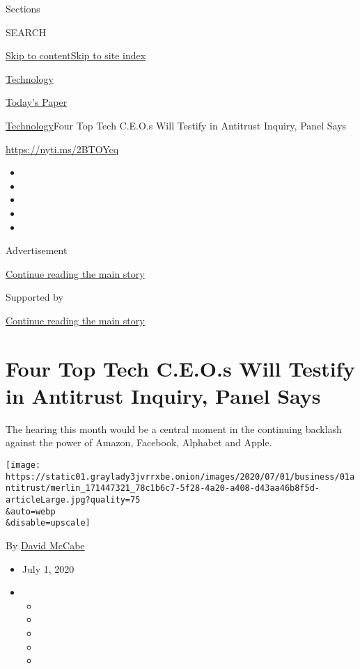 Sections

SEARCH

\protect\hyperlink{site-content}{Skip to
content}\protect\hyperlink{site-index}{Skip to site index}

\href{https://www.nytimes3xbfgragh.onion/section/technology}{Technology}

\href{https://myaccount.nytimes3xbfgragh.onion/auth/login?response_type=cookie\&client_id=vi}{}

\href{https://www.nytimes3xbfgragh.onion/section/todayspaper}{Today's
Paper}

\href{/section/technology}{Technology}\textbar{}Four Top Tech C.E.O.s
Will Testify in Antitrust Inquiry, Panel Says

\url{https://nyti.ms/2BTOYcq}

\begin{itemize}
\item
\item
\item
\item
\item
\end{itemize}

Advertisement

\protect\hyperlink{after-top}{Continue reading the main story}

Supported by

\protect\hyperlink{after-sponsor}{Continue reading the main story}

\hypertarget{four-top-tech-ceos-will-testify-in-antitrust-inquiry-panel-says}{%
\section{Four Top Tech C.E.O.s Will Testify in Antitrust Inquiry, Panel
Says}\label{four-top-tech-ceos-will-testify-in-antitrust-inquiry-panel-says}}

The hearing this month would be a central moment in the continuing
backlash against the power of Amazon, Facebook, Alphabet and Apple.

\texttt{[image: https://static01.graylady3jvrrxbe.onion/images/2020/07/01/business/01antitrust/merlin\_171447321\_78c1b6c7-5f28-4a20-a408-d43aa46b8f5d-articleLarge.jpg?quality=75\\\&auto=webp\\\&disable=upscale]}

By \href{https://www.nytimes3xbfgragh.onion/by/david-mccabe}{David
McCabe}

\begin{itemize}
\item
  July 1, 2020
\item
  \begin{itemize}
  \item
  \item
  \item
  \item
  \item
  \end{itemize}
\end{itemize}

